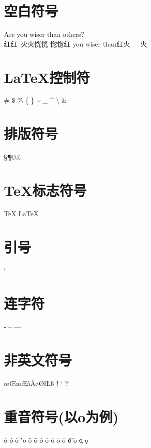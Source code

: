 \documentclass{article}
\begin{document}
    \section{空白符号}
    Are you wiser than        others?\\
    红红\ 火火恍恍  惚惚红   you wiser than红火\ \ \ 火\quad{}%
    \section{\LaTeX 控制符}%
    \# \$ \% \{ \} \~{} \_{} \^{} \textbackslash%
    \&
    \section{排版符号}
    \S \P \dag \ddag \copyright \pounds
    \section{\TeX 标志符号}
    \TeX{} \LaTeX{} \LaTeXe{}
    \section{引号}
    `%
    \section{连字符}
    - -- ---
    \section{非英文符号}
    \oe \OE \ae \AE \aa \AA \o \O \l \L \ss \SS ！` ?`
    \section{重音符号(以o为例)}
    \`o \'o \^o \''o \~o \=o \.o \u{o} \v{o} \H{o} \r{o}
    \t{o} \b{o} \c{o} \d{o}
\end{document}
